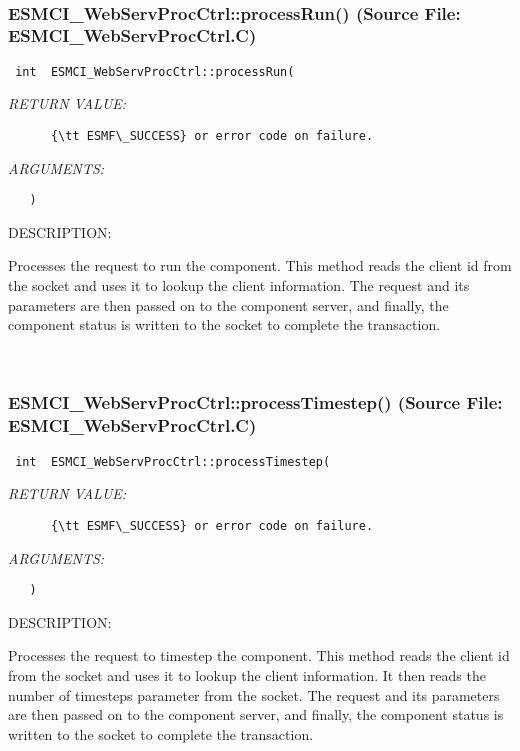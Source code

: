  
\mbox{}\hrulefill\
 
\subsubsection{ESMCI\_WebServProcCtrl::processRun() (Source File: ESMCI\_WebServProcCtrl.C)}


  
\begin{verbatim} int  ESMCI_WebServProcCtrl::processRun(\end{verbatim}{\em RETURN VALUE:}
\begin{verbatim}      {\tt ESMF\_SUCCESS} or error code on failure.\end{verbatim}{\em ARGUMENTS:}
\begin{verbatim}   )\end{verbatim}
{\sf DESCRIPTION:\\ }


      Processes the request to run the component.  This method reads the
      client id from the socket and uses it to lookup the client information.
      The request and its parameters are then passed on to the component
      server, and finally, the component status is written to the socket
      to complete the transaction.
   
 
\mbox{}\hrulefill\
 
\subsubsection{ESMCI\_WebServProcCtrl::processTimestep() (Source File: ESMCI\_WebServProcCtrl.C)}


  
\begin{verbatim} int  ESMCI_WebServProcCtrl::processTimestep(\end{verbatim}{\em RETURN VALUE:}
\begin{verbatim}      {\tt ESMF\_SUCCESS} or error code on failure.\end{verbatim}{\em ARGUMENTS:}
\begin{verbatim}   )\end{verbatim}
{\sf DESCRIPTION:\\ }


      Processes the request to timestep the component.  This method reads the
      client id from the socket and uses it to lookup the client information.
      It then reads the number of timesteps parameter from the socket.
      The request and its parameters are then passed on to the component
      server, and finally, the component status is written to the socket
      to complete the transaction.
   
